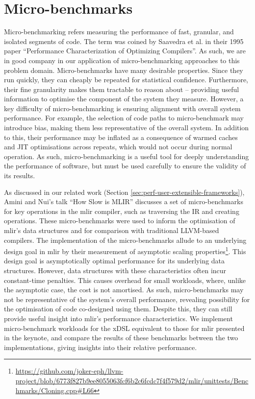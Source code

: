 \section{Micro-benchmarks}
\label{sec:ubenchmark}

Micro-benchmarking refers measuring the performance of fast, granular, and isolated segments of code.
The term was coined by Saavedra et al. in their 1995 paper \cite{saavedraPerformanceCharacterizationOptimizing1995} ``Performance Characterization of Optimizing Compilers''. As such, we are in good company in our application of micro-benchmarking approaches to this problem domain.
Micro-benchmarks have many desirable properties. Since they run quickly, they can cheaply be repeated for statistical confidence.
Furthermore, their fine granularity makes them tractable to reason about -- providing useful information to optimise the component of the system they measure.
However, a key difficulty of micro-benchmarking is ensuring alignment with overall system performance. For example, the selection of code paths to micro-benchmark may introduce bias, making them less representative of the overall system. In addition to this, their performance may be inflated as a consequence of warmed caches and JIT optimisations across repeats, which would not occur during normal operation.
As such, micro-benchmarking is a useful tool for deeply understanding the performance of software, but must be used carefully to ensure the validity of its results.

As discussed in our related work (Section \ref{sec:perf-user-extensible-frameworks}), Amini and Nui's talk ``How Slow is MLIR'' \cite{aminiHowSlowMLIR2024} discusses a set of micro-benchmarks for key operations in the \ac{mlir} compiler, such as traversing the IR and creating operations.
These micro-benchmarks were used to inform the optimisation of \ac{mlir}'s data structures and for comparison with traditional LLVM-based compilers. The implementation of the micro-benchmarks allude to an underlying design goal in \ac{mlir} by their measurement of asymptotic scaling properties\footnote{\url{https://github.com/joker-eph/llvm-project/blob/6773f827b9ee8055063fcf6b2c6fcdc7f4f579d2/mlir/unittests/Benchmarks/Cloning.cpp\#L66}}. This design goal is asymptotically optimal performance for its underlying data structures. However, data structures with these characteristics often incur constant-time penalties.
This causes overhead for small workloads, where, unlike the asymptotic case, the cost is not amortised. As such, micro-benchmarks may not be representative of the system's overall performance, revealing possibility for the optimisation of code co-designed using them.
Despite this, they can still provide useful insight into \ac{mlir}'s performance characteristics.
We implement micro-benchmark workloads for the xDSL equivalent to those for \ac{mlir} presented in the keynote, and compare the results of these benchmarks between the two implementations, giving insights into their relative performance.

